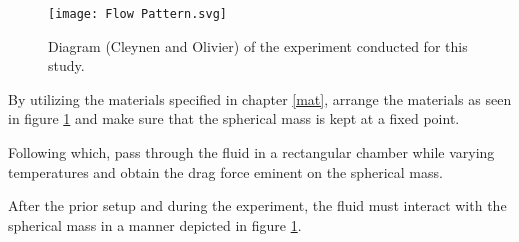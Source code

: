\begin{figure}[H]
    \centering
    \texttt{[image: Flow Pattern.svg]}
	\caption{{Diagram (Cleynen and Olivier) of the experiment conducted for this study.}}
    \label{exp1}
\end{figure}


{By utilizing the materials specified in chapter \ref{mat}, arrange the materials as seen in figure \ref{exp1} and make sure that the spherical mass is kept at a fixed point.}

{Following which, pass through the fluid in a rectangular chamber while varying temperatures and obtain the drag force eminent on the spherical mass.}

{After the prior setup and during the experiment, the fluid must interact with the spherical mass in a manner depicted in figure \ref{exp1}.}


